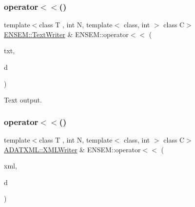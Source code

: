 \subsubsection{\texorpdfstring{operator$<$$<$()}{operator<<()}\hspace{0.1cm}{\footnotesize\ttfamily [1/2]}}
{\footnotesize\ttfamily template$<$class T , int N, template$<$ class, int $>$ class C$>$ \\
\mbox{\hyperlink{classENSEM_1_1TextWriter}{E\+N\+S\+E\+M\+::\+Text\+Writer}} \& E\+N\+S\+E\+M\+::operator$<$$<$ (\begin{DoxyParamCaption}\item[{\mbox{\hyperlink{classENSEM_1_1TextWriter}{E\+N\+S\+E\+M\+::\+Text\+Writer}} \&}]{txt,  }\item[{const \mbox{\hyperlink{classENSEM_1_1PMatrix}{P\+Matrix}}$<$ T, \mbox{\hyperlink{adat__devel_2lib_2hadron_2operator__name__util_8cc_a7722c8ecbb62d99aee7ce68b1752f337}{N}}, C $>$ \&}]{d }\end{DoxyParamCaption})\hspace{0.3cm}{\ttfamily [inline]}}



Text output. 

\mbox{\label{group__primmatrix_ga88162a3095bbb5b40ba8100093befe2b}} 
\subsubsection{\texorpdfstring{operator$<$$<$()}{operator<<()}\hspace{0.1cm}{\footnotesize\ttfamily [2/2]}}
{\footnotesize\ttfamily template$<$class T , int N, template$<$ class, int $>$ class C$>$ \\
\mbox{\hyperlink{classADATXML_1_1XMLWriter}{A\+D\+A\+T\+X\+M\+L\+::\+X\+M\+L\+Writer}} \& E\+N\+S\+E\+M\+::operator$<$$<$ (\begin{DoxyParamCaption}\item[{\mbox{\hyperlink{classADATXML_1_1XMLWriter}{A\+D\+A\+T\+X\+M\+L\+::\+X\+M\+L\+Writer}} \&}]{xml,  }\item[{const \mbox{\hyperlink{classENSEM_1_1PMatrix}{P\+Matrix}}$<$ T, \mbox{\hyperlink{adat__devel_2lib_2hadron_2operator__name__util_8cc_a7722c8ecbb62d99aee7ce68b1752f337}{N}}, C $>$ \&}]{d }\end{DoxyParamCaption})\hspace{0.3cm}{\ttfamily [inline]}}



